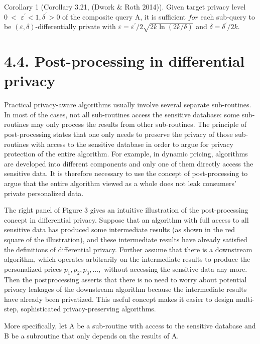 Corollary 1 (Corollary 3.21, (Dwork \& Roth 2014)). Given target privacy level \(0 ~ <\) \(\varepsilon ^ { \prime } < 1 , \delta ^ { \prime } > 0\) of the composite query A, it is sufficient \(f o r\) each sub-query to be \(( \varepsilon , \delta )\)-differentially private with \(\varepsilon = \varepsilon ^ { \prime } / 2 \sqrt { 2 k \ln ( 2 k / \delta ) }\) and \(\delta = \delta ^ { \prime } / 2 k\).

\section{4.4. Post-processing in differential privacy}\label{post-processing-in-differential-privacy}

Practical privacy-aware algorithms usually involve several separate sub-routines. In most of the cases, not all sub-routines access the sensitive database: some sub-routines may only process the results from other sub-routines. The principle of post-processing states that one only needs to preserve the privacy of those sub-routines with access to the sensitive database in order to argue for privacy protection of the entire algorithm. For example, in dynamic pricing, algorithms are developed into different components and only one of them directly access the sensitive data. It is therefore necessary to use the concept of post-processing to argue that the entire algorithm viewed as a whole does not leak consumers' private personalized data.

The right panel of Figure 3 gives an intuitive illustration of the post-processing concept in differential privacy. Suppose that an algorithm with full access to all sensitive data has produced some intermediate results (as shown in the red square of the illustration), and these intermediate results have already satisfied the definitions of differential privacy. Further assume that there is a downstream algorithm, which operates arbitrarily on the intermediate results to produce the personalized prices \(p _ { 1 } , p _ { 2 } , p _ { 3 } , . . . ,\) without accessing the sensitive data any more. Then the postprocessing asserts that there is no need to worry about potential privacy leakages of the downstream algorithm because the intermediate results have already been privatized. This useful concept makes it easier to design multi-step, sophisticated privacy-preserving algorithms.

More specifically, let A be a sub-routine with access to the sensitive database and B be a subroutine that only depends on the results of A.


